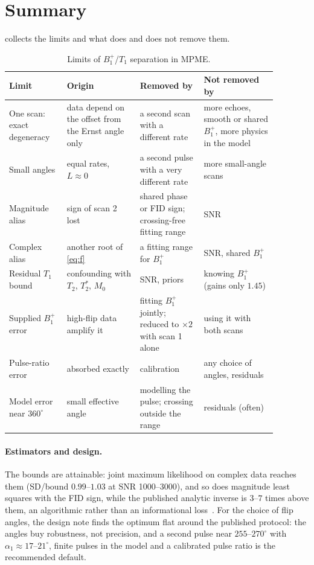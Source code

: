 \documentclass[11pt]{article}
\newcommand{\Bone}{B_1^{+}}
\newcommand{\Tone}{T_1}
\newcommand{\Ttwo}{T_2}
\newcommand{\Ttwos}{T_2^{*}}
\newcommand{\Mzero}{M_0}
\begin{document}
\section{Summary}\label{sec:summary}

 collects the limits and what does and does not remove them.

\begin{table}[!htb]
\centering
\caption{Limits of $\Bone$/$\Tone$ separation in MPME.}
\label{tab:limits}
\small
\begin{tabular}{p{0.19\linewidth}p{0.24\linewidth}p{0.21\linewidth}p{0.24\linewidth}}
\toprule
Limit & Origin & Removed by & Not removed by\\
\midrule
One scan: exact degeneracy & data depend on the offset from the Ernst angle only &
  a second scan with a different rate & more echoes, smooth or shared $\Bone$, more physics in the model\\
Small angles & equal rates, $L\approx0$ & a second pulse with a very different rate & more small-angle scans\\
Magnitude alias & sign of scan 2 lost & shared phase or FID sign; crossing-free fitting range & SNR\\
Complex alias & another root of \eqref{eq:f} & a fitting range for $\Bone$ & SNR, shared $\Bone$\\
Residual $\Tone$ bound & confounding with $\Ttwo$, $\Ttwos$, $\Mzero$ & SNR, priors & knowing $\Bone$ (gains only $1.45$)\\
Supplied $\Bone$ error & high-flip data amplify it & fitting $\Bone$ jointly; reduced to $\times2$ with scan 1 alone & using it with both scans\\
Pulse-ratio error & absorbed exactly & calibration & any choice of angles, residuals\\
Model error near $360^\circ$ & small effective angle & modelling the pulse; crossing outside the range & residuals (often)\\
\bottomrule
\end{tabular}
\end{table}

\paragraph{Estimators and design.} The bounds are attainable: joint maximum likelihood on complex
data reaches them (SD/bound $0.99$--$1.03$ at SNR 1000--3000), and so does magnitude least squares with the
FID sign, while the published analytic inverse is $3$--$7$ times above them, an algorithmic rather than
an informational loss~\cite[Secs.~6--7]{technote}. For the choice of flip angles, the design note
\cite{flipnote} finds the optimum flat around the published protocol: the angles buy robustness,
not precision, and a second pulse near $255$--$270^\circ$ with $\alpha_1\approx17$--$21^\circ$, finite pulses in the model and a
calibrated pulse ratio is the recommended default.
\end{document}
